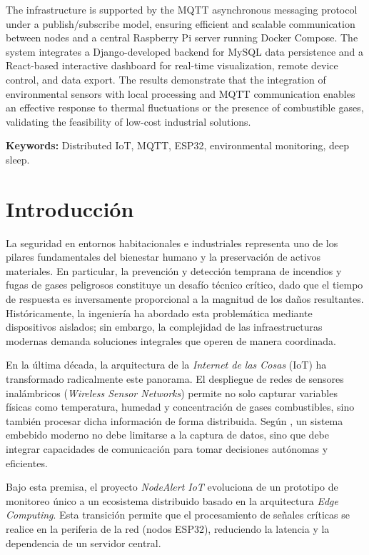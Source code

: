 \documentclass[11pt,a4paper]{article}
\begin{document}
The infrastructure is supported by the MQTT asynchronous messaging protocol under a publish/subscribe model, ensuring efficient and scalable communication between nodes and a central Raspberry Pi server running Docker Compose. The system integrates a Django-developed backend for MySQL data persistence and a React-based interactive dashboard for real-time visualization, remote device control, and data export. The results demonstrate that the integration of environmental sensors with local processing and MQTT communication enables an effective response to thermal fluctuations or the presence of combustible gases, validating the feasibility of low-cost industrial solutions.

\textbf{Keywords:} Distributed IoT, MQTT, ESP32, environmental monitoring, deep sleep.

\section{Introducción}
La seguridad en entornos habitacionales e industriales representa uno de los pilares fundamentales del bienestar humano y la preservación de activos materiales. En particular, la prevención y detección temprana de incendios y fugas de gases peligrosos constituye un desafío técnico crítico, dado que el tiempo de respuesta es inversamente proporcional a la magnitud de los daños resultantes. Históricamente, la ingeniería ha abordado esta problemática mediante dispositivos aislados; sin embargo, la complejidad de las infraestructuras modernas demanda soluciones integrales que operen de manera coordinada.

En la última década, la arquitectura de la \textit{Internet de las Cosas} (IoT) ha transformado radicalmente este panorama. El despliegue de redes de sensores inalámbricos (\textit{Wireless Sensor Networks}) permite no solo capturar variables físicas como temperatura, humedad y concentración de gases combustibles, sino también procesar dicha información de forma distribuida. Según \citet{valvano2014volume1}, un sistema embebido moderno no debe limitarse a la captura de datos, sino que debe integrar capacidades de comunicación para tomar decisiones autónomas y eficientes.

Bajo esta premisa, el proyecto \textit{NodeAlert IoT} evoluciona de un prototipo de monitoreo único a un ecosistema distribuido basado en la arquitectura \textit{Edge Computing}. Esta transición permite que el procesamiento de señales críticas se realice en la periferia de la red (nodos ESP32), reduciendo la latencia y la dependencia de un servidor central. 
\end{document}
